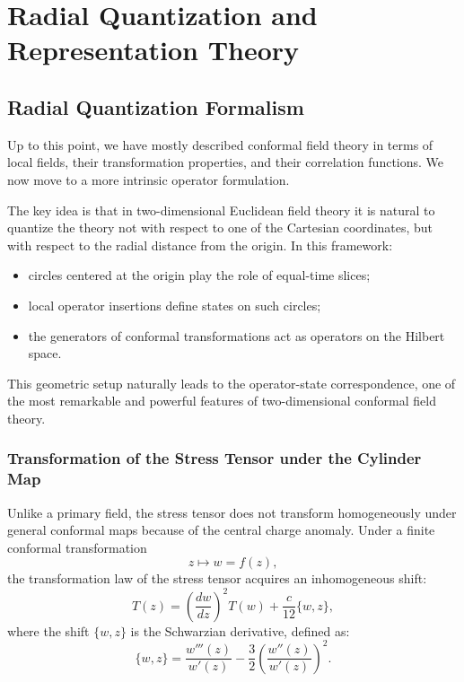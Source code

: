 \chapter[Radial Quantization and Representation Theory]{Radial Quantization and\\Representation Theory}

\section{Radial Quantization Formalism}
\label{sec:radial_quantization_state_operator}

Up to this point, we have mostly described conformal field theory in terms of local fields, their transformation properties, and their correlation functions. We now move to a more intrinsic operator formulation.

The key idea is that in two-dimensional Euclidean field theory it is natural to quantize the theory not with respect to one of the Cartesian coordinates, but with respect to the radial distance from the origin. In this framework:
\begin{itemize}
    \item circles centered at the origin play the role of equal-time slices;
    \item local operator insertions define states on such circles;
    \item the generators of conformal transformations act as operators on the Hilbert space.
\end{itemize}
This geometric setup naturally leads to the operator-state correspondence, one of the most remarkable and powerful features of two-dimensional conformal field theory.

\subsection{Transformation of the Stress Tensor under the Cylinder Map}

Unlike a primary field, the stress tensor does not transform homogeneously under general conformal maps because of the central charge anomaly. Under a finite conformal transformation
\[
    z \mapsto w = f(z),
\]
the transformation law of the stress tensor acquires an inhomogeneous shift:
\[
    T(z) = \left(\frac{dw}{dz}\right)^2 T(w) + \frac{c}{12}\{w, z\},
\]
where the shift \(\{w, z\}\) is the Schwarzian derivative, defined as:
\[
    \{w, z\} = \frac{w'''(z)}{w'(z)} - \frac{3}{2}\left(\frac{w''(z)}{w'(z)}\right)^2.
\]

